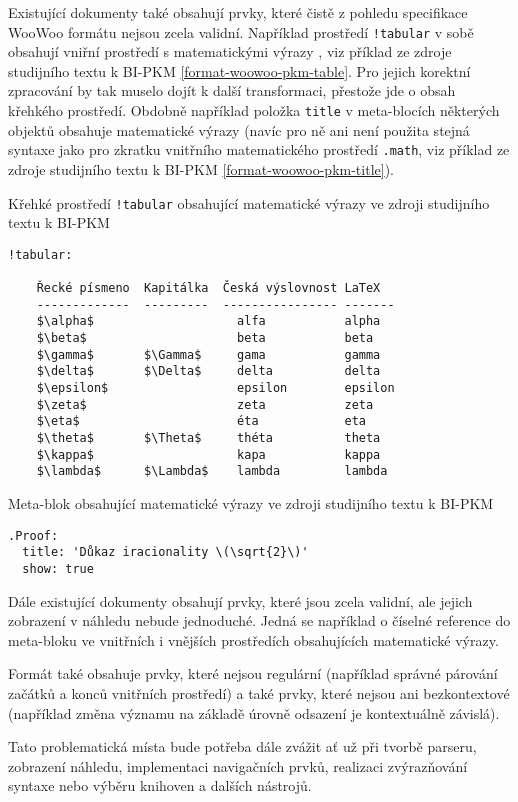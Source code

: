 Existující dokumenty také obsahují prvky, které čistě z pohledu specifikace WooWoo formátu nejsou zcela validní.
Například prostředí \texttt{!tabular} v sobě obsahují vniřní prostředí s matematickými výrazy \cite{pkm}, viz
příklad ze zdroje studijního textu k BI-PKM \ref{format-woowoo-pkm-table}. Pro jejich korektní zpracování by tak muselo
dojít k další transformaci, přestože jde o obsah křehkého prostředí. Obdobně například položka \texttt{title}
v meta-blocích některých objektů obsahuje matematické výrazy (navíc pro ně ani není použita stejná syntaxe jako pro
zkratku vnitřního matematického prostředí \texttt{.math}, viz příklad ze zdroje studijního textu k BI-PKM
\ref{format-woowoo-pkm-title}).

\begin{listing}
    \caption{Křehké prostředí \texttt{!tabular} obsahující matematické výrazy ve zdroji studijního textu k
      BI-PKM~\cite{pkm}}
    \label{format-woowoo-pkm-table}
    \begin{verbatim}
!tabular:

    Řecké písmeno  Kapitálka  Česká výslovnost LaTeX
    -------------  ---------  ---------------- -------
    $\alpha$                    alfa           alpha
    $\beta$                     beta           beta
    $\gamma$       $\Gamma$     gama           gamma
    $\delta$       $\Delta$     delta          delta
    $\epsilon$                  epsilon        epsilon
    $\zeta$                     zeta           zeta
    $\eta$                      éta            eta
    $\theta$       $\Theta$     théta          theta
    $\kappa$                    kapa           kappa
    $\lambda$      $\Lambda$    lambda         lambda
    \end{verbatim}
\end{listing}

\begin{listing}
    \caption{Meta-blok obsahující matematické výrazy ve zdroji studijního textu k BI-PKM \cite{pkm}}
    \label{format-woowoo-pkm-title}
    \begin{verbatim}
.Proof:
  title: 'Důkaz iracionality \(\sqrt{2}\)'
  show: true
    \end{verbatim}
\end{listing}

Dále existující dokumenty obsahují prvky, které jsou zcela validní, ale jejich zobrazení v náhledu nebude jednoduché.
Jedná se například o číselné reference do meta-bloku ve vnitřních i vnějších prostředích obsahujících matematické
výrazy.

Formát také obsahuje prvky, které nejsou regulární (například správné párování začátků a konců vnitřních prostředí) a
také prvky, které nejsou ani bezkontextové (například změna významu na základě úrovně odsazení je kontextuálně závislá).

Tato problematická místa bude potřeba dále zvážit ať už při tvorbě parseru, zobrazení náhledu, implementaci navigačních
prvků, realizaci zvýrazňování syntaxe nebo výběru knihoven a dalších nástrojů.
